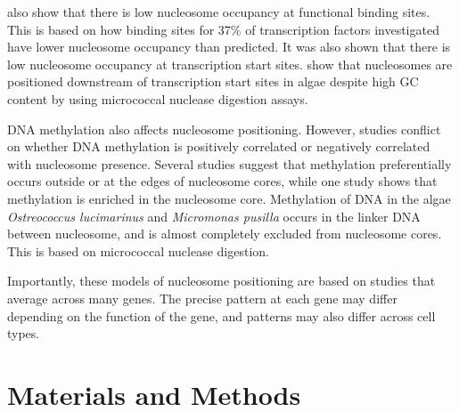 \documentclass[parskip=full, numbers=noenddot]{scrreprt}
\begin{document}
\cite{segal_genomic_2006} also show that there is low nucleosome occupancy at functional binding sites.  This is based on how binding sites for 37\% of transcription factors investigated have lower nucleosome occupancy than predicted.  It was also shown that there is low nucleosome occupancy at transcription start sites.  \cite{huff_dnmt1-independent_2014} show that nucleosomes are positioned downstream of transcription start sites in algae despite high GC content by using micrococcal nuclease digestion assays.


DNA methylation also affects nucleosome positioning.
However, studies conflict on whether DNA methylation is positively correlated or negatively correlated with nucleosome presence.  Several studies suggest that methylation preferentially occurs outside or at the edges of nucleosome cores, while one study shows that methylation is enriched in the nucleosome core. %
Methylation of DNA in the algae \emph{Ostreococcus lucimarinus} and \emph{Micromonas pusilla} occurs in the linker DNA between nucleosome, and is almost completely excluded from nucleosome cores.  This is based on micrococcal nuclease digestion.  



Importantly, these models of nucleosome positioning are based on studies that average across many genes.  The precise pattern at each gene may differ depending on the function of the gene, and patterns may also differ across cell types.



\subsection{}
\label{ssec:emsaselex_intro_why}


\section{Materials and Methods}
\label{sec:emsaselex_methods}
\end{document}
